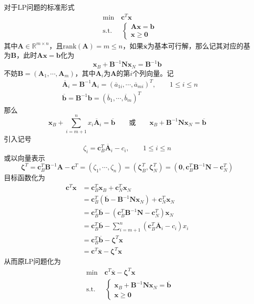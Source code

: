 \documentclass[lang = cn, scheme = chinese, thmcnt = section]{elegantbook}
\newcommand{\R}{\mathbb{R}}            %
\newcommand{\bs}{\boldsymbol}          %
\begin{document}
对于LP问题的标准形式
\begin{align*}
	& \text{min}  \quad \bs{c}^T\bs{x}\\
	& \text{s.t.} \;\, \quad \begin{cases}
		\bs{A} \bs{x} = \bs{b}\\
		\bs{x} \ge \bs{0}
	\end{cases}
\end{align*}
其中$\bs{A}\in\R^{m\times n}$，且$\text{rank}(\bs{A})=m\le n$，如果$\overline{\bs{x}}$为基本可行解，那么记其对应的基为$\bs{B}$，此时$\bs{Ax}=\bs{b}$化为
$$
\bs{x}_B+\bs{B}^{-1}\bs{Nx}_N=\bs{B}^{-1}\bs{b}
$$
不妨$\bs{B}=(\bs{A}_1,\cdots,\bs{A}_m)$，其中$\bs{A}_i$为$\bs{A}$的第$i$个列向量。记
\begin{align*}
	& \overline{\bs{A}}_i=\bs{B}^{-1}\bs{A}_i
	=(\overline{a}_{1i},\cdots,\overline{a}_{mi})^T,\qquad 
	1\le i\le n\\
	& \overline{\bs{b}}=\bs{B}^{-1}\bs{b}
	=(\overline{b}_{1},\cdots,\overline{b}_{m})^T
\end{align*}
那么
$$
\bs{x}_B+\sum_{i=m+1}^{n}x_i\overline{\bs{A}}_i=\overline{\bs{b}}
\qquad \text{或} \qquad
\bs{x}_B+\bs{B}^{-1}\bs{Nx}_N=\overline{\bs{b}}
$$
引入记号
$$
\zeta_i=\bs{c}_B^T\overline{\bs{A}}_i-c_i,\qquad 1\le i\le n
$$
或以向量表示
$$
\bs{\zeta}^T
=\bs{c}_B^T\bs{B}^{-1}\bs{A}-\bs{c}^T
=(\zeta_1,\cdots,\zeta_n)
=(\bs{\zeta}_B^T,\bs{\zeta}_N^T)
=(\bs{0},\bs{c}_B^T\bs{B}^{-1}\bs{N}-\bs{c}_N^T)
$$
目标函数化为
\begin{align*}
	\bs{c}^T\bs{x}
	& = \bs{c}_B^T\bs{x}_B+\bs{c}_N^T\bs{x}_N \\
	& = \bs{c}_B^T(\overline{\bs{b}}-\bs{B}^{-1}\bs{Nx}_N)+\bs{c}_N^T\bs{x}_N\\
	& = \bs{c}_B^T\overline{\bs{b}}- (\bs{c}_B^T\bs{B}^{-1}\bs{N}-\bs{c}_N^T)\bs{x}_N\\
	& = \bs{c}_B^T\overline{\bs{b}}-\sum_{i=m+1}^{n}(\bs{c}_B^T\overline{\bs{A}}_i-c_i)x_i\\
	& = \bs{c}_B^T\overline{\bs{b}}-\bs{\zeta}^T\bs{x}\\
	& = \bs{c}^T\overline{\bs{x}}-\bs{\zeta}^T\bs{x}
\end{align*}
从而原LP问题化为
\begin{align*}
	& \text{min}  \quad \bs{c}^T\overline{\bs{x}}-\bs{\zeta}^T\bs{x}\\
	& \text{s.t.} \;\, \quad \begin{cases}
		\bs{x}_B+\bs{B}^{-1}\bs{Nx}_N=\overline{\bs{b}}\\
		\bs{x} \ge \bs{0}
	\end{cases}
\end{align*}
\end{document}
